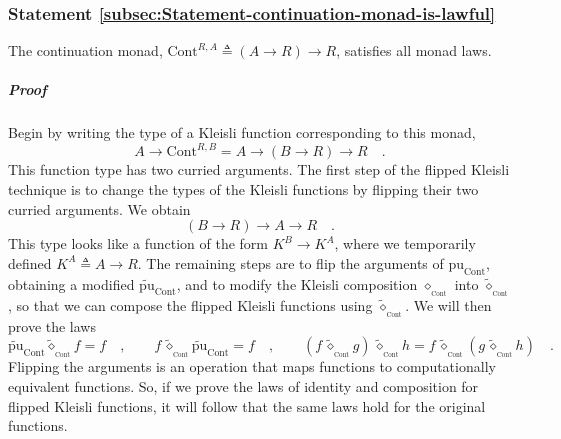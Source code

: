 \subsubsection{Statement \label{subsec:Statement-continuation-monad-is-lawful}\ref{subsec:Statement-continuation-monad-is-lawful}}

The continuation monad, $\text{Cont}^{R,A}\triangleq\left(A\rightarrow R\right)\rightarrow R$,
satisfies all monad laws.

\subparagraph{Proof}

Begin by writing the type of a Kleisli function corresponding to this
monad,
\[
A\rightarrow\text{Cont}^{R,B}=A\rightarrow\left(B\rightarrow R\right)\rightarrow R\quad.
\]
This function type has two curried arguments. The first step of the
flipped Kleisli technique is to change the types of the Kleisli functions
by flipping their two curried arguments. We obtain
\[
\left(B\rightarrow R\right)\rightarrow A\rightarrow R\quad.
\]
This type looks like a function of the form $K^{B}\rightarrow K^{A}$,
where we temporarily defined $K^{A}\triangleq A\rightarrow R$. The
remaining steps are to flip the arguments of $\text{pu}_{\text{Cont}}$,
obtaining a modified $\tilde{\text{pu}}_{\text{Cont}}$, and to modify
the Kleisli composition $\diamond_{_{\text{Cont}}}$ into $\tilde{\diamond}_{_{\text{Cont}}}$,
so that we can compose the flipped Kleisli functions using $\tilde{\diamond}_{_{\text{Cont}}}$.
We will then prove the laws
\[
\tilde{\text{pu}}_{\text{Cont}}\tilde{\diamond}_{_{\text{Cont}}}f=f\quad,\quad\quad f\,\tilde{\diamond}_{_{\text{Cont}}}\tilde{\text{pu}}_{\text{Cont}}=f\quad,\quad\quad(f\,\tilde{\diamond}_{_{\text{Cont}}}g)\,\tilde{\diamond}_{_{\text{Cont}}}h=f\,\tilde{\diamond}_{_{\text{Cont}}}(g\,\tilde{\diamond}_{_{\text{Cont}}}h)\quad.
\]
Flipping the arguments is an operation that maps functions to computationally
equivalent functions. So, if we prove the laws of identity and composition
for flipped Kleisli functions, it will follow that the same laws hold
for the original functions.

